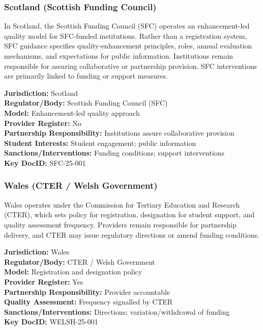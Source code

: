 \subsubsection*{Scotland (Scottish Funding Council)}

In Scotland, the Scottish Funding Council (SFC) operates an enhancement-led quality model for
SFC-funded institutions. Rather than a registration system, SFC guidance specifies
quality-enhancement principles, roles, annual evaluation mechanisms, and expectations for
public information. Institutions remain responsible for assuring collaborative or
partnership provision. SFC interventions are primarily linked to funding or support measures.

\begin{tcolorbox}
\textbf{Jurisdiction:} Scotland \\
\textbf{Regulator/Body:} Scottish Funding Council (SFC) \\
\textbf{Model:} Enhancement-led quality approach \\
\textbf{Provider Register:} No \\
\textbf{Partnership Responsibility:} Institutions assure collaborative provision \\
\textbf{Student Interests:} Student engagement; public information \\
\textbf{Sanctions/Interventions:} Funding conditions; support interventions \\
\textbf{Key DocID:} SFC-25-001
\end{tcolorbox}

\subsubsection*{Wales (CTER / Welsh Government)}

Wales operates under the Commission for Tertiary Education and Research (CTER), which sets
policy for registration, designation for student support, and quality assessment frequency.
Providers remain responsible for partnership delivery, and CTER may issue regulatory
directions or amend funding conditions.

\begin{tcolorbox}
\textbf{Jurisdiction:} Wales \\
\textbf{Regulator/Body:} CTER / Welsh Government \\
\textbf{Model:} Registration and designation policy \\
\textbf{Provider Register:} Yes \\
\textbf{Partnership Responsibility:} Provider accountable \\
\textbf{Quality Assessment:} Frequency signalled by CTER \\
\textbf{Sanctions/Interventions:} Directions; variation/withdrawal of funding \\
\textbf{Key DocID:} WELSH-25-001
\end{tcolorbox}

